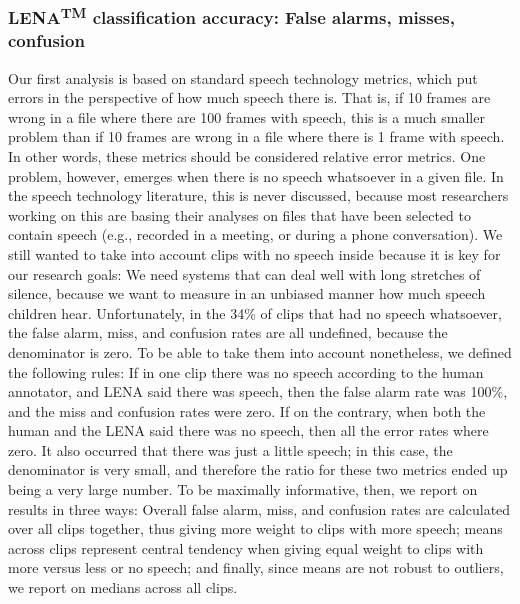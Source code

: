 \documentclass[english,floatsintext,man]{apa6}
\begin{document}
\subsubsection{\texorpdfstring{LENA\textsuperscript{TM} classification
accuracy: False alarms, misses,
confusion}{LENATM classification accuracy: False alarms, misses, confusion}}\label{lenatm-classification-accuracy-false-alarms-misses-confusion}

Our first analysis is based on standard speech technology metrics, which
put errors in the perspective of how much speech there is. That is, if
10 frames are wrong in a file where there are 100 frames with speech,
this is a much smaller problem than if 10 frames are wrong in a file
where there is 1 frame with speech. In other words, these metrics should
be considered relative error metrics. One problem, however, emerges when
there is no speech whatsoever in a given file. In the speech technology
literature, this is never discussed, because most researchers working on
this are basing their analyses on files that have been selected to
contain speech (e.g., recorded in a meeting, or during a phone
conversation). We still wanted to take into account clips with no speech
inside because it is key for our research goals: We need systems that
can deal well with long stretches of silence, because we want to measure
in an unbiased manner how much speech children hear. Unfortunately, in
the 34\% of clips that had no speech whatsoever, the false alarm, miss,
and confusion rates are all undefined, because the denominator is zero.
To be able to take them into account nonetheless, we defined the
following rules: If in one clip there was no speech according to the
human annotator, and LENA said there was speech, then the false alarm
rate was 100\%, and the miss and confusion rates were zero. If on the
contrary, when both the human and the LENA said there was no speech,
then all the error rates where zero. It also occurred that there was
just a little speech; in this case, the denominator is very small, and
therefore the ratio for these two metrics ended up being a very large
number. To be maximally informative, then, we report on results in three
ways: Overall false alarm, miss, and confusion rates are calculated over
all clips together, thus giving more weight to clips with more speech;
means across clips represent central tendency when giving equal weight
to clips with more versus less or no speech; and finally, since means
are not robust to outliers, we report on medians across all clips.
\end{document}
